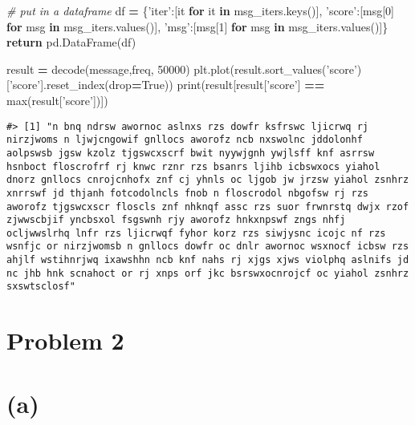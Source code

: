 \documentclass[]{article}
\newenvironment{Shaded}{\begin{snugshade}}{\end{snugshade}}
\newcommand{\BuiltInTok}[1]{#1}
\newcommand{\CommentTok}[1]{\textcolor[rgb]{0.56,0.35,0.01}{\textit{#1}}}
\newcommand{\ControlFlowTok}[1]{\textcolor[rgb]{0.13,0.29,0.53}{\textbf{#1}}}
\newcommand{\DecValTok}[1]{\textcolor[rgb]{0.00,0.00,0.81}{#1}}
\newcommand{\KeywordTok}[1]{\textcolor[rgb]{0.13,0.29,0.53}{\textbf{#1}}}
\newcommand{\NormalTok}[1]{#1}
\newcommand{\OperatorTok}[1]{\textcolor[rgb]{0.81,0.36,0.00}{\textbf{#1}}}
\newcommand{\StringTok}[1]{\textcolor[rgb]{0.31,0.60,0.02}{#1}}
\newcommand{\VariableTok}[1]{\textcolor[rgb]{0.00,0.00,0.00}{#1}}
\begin{document}
\begin{Shaded}
\begin{Highlighting}[]
    \CommentTok{# put in a dataframe}
\NormalTok{    df }\OperatorTok{=}\NormalTok{ \{}\StringTok{'iter'}\NormalTok{:[it }\ControlFlowTok{for}\NormalTok{ it }\KeywordTok{in}\NormalTok{ msg_iters.keys()],}
          \StringTok{'score'}\NormalTok{:[msg[}\DecValTok{0}\NormalTok{] }\ControlFlowTok{for}\NormalTok{ msg }\KeywordTok{in}\NormalTok{ msg_iters.values()],}
          \StringTok{'msg'}\NormalTok{:[msg[}\DecValTok{1}\NormalTok{] }\ControlFlowTok{for}\NormalTok{ msg }\KeywordTok{in}\NormalTok{ msg_iters.values()]\}}
    \ControlFlowTok{return}\NormalTok{ pd.DataFrame(df)}

\NormalTok{result }\OperatorTok{=}\NormalTok{ decode(message,freq, }\DecValTok{50000}\NormalTok{)}
\NormalTok{plt.plot(result.sort_values(}\StringTok{'score'}\NormalTok{)[}\StringTok{'score'}\NormalTok{].reset_index(drop}\OperatorTok{=}\VariableTok{True}\NormalTok{))}
\BuiltInTok{print}\NormalTok{(result[result[}\StringTok{'score'}\NormalTok{] }\OperatorTok{==} \BuiltInTok{max}\NormalTok{(result[}\StringTok{'score'}\NormalTok{])])}
\end{Highlighting}
\end{Shaded}

\begin{verbatim}
#> [1] "n bnq ndrsw awornoc aslnxs rzs dowfr ksfrswc ljicrwq rj nirzjwoms n ljwjcngowif gnllocs aworofz ncb nxswolnc jddolonhf aolpswsb jgsw kzolz tjgswcxscrf bwit nyywjgnh ywjlsff knf asrrsw hsnboct floscrofrf rj knwc rznr rzs bsanrs ljihb icbswxocs yiahol dnorz gnllocs cnrojcnhofx znf cj yhnls oc ljgob jw jrzsw yiahol zsnhrz xnrrswf jd thjanh fotcodolncls fnob n floscrodol nbgofsw rj rzs aworofz tjgswcxscr floscls znf nhknqf assc rzs suor frwnrstq dwjx rzof zjwwscbjif yncbsxol fsgswnh rjy aworofz hnkxnpswf zngs nhfj ocljwwslrhq lnfr rzs ljicrwqf fyhor korz rzs siwjysnc icojc nf rzs wsnfjc or nirzjwomsb n gnllocs dowfr oc dnlr awornoc wsxnocf icbsw rzs ahjlf wstihnrjwq ixawshhn ncb knf nahs rj xjgs xjws violphq aslnifs jd nc jhb hnk scnahoct or rj xnps orf jkc bsrswxocnrojcf oc yiahol zsnhrz sxswtsclosf"
\end{verbatim}

\hypertarget{problem-2}{%
\section{Problem 2}\label{problem-2}}

\hypertarget{a}{%
\section{(a)}\label{a}}
\end{document}
